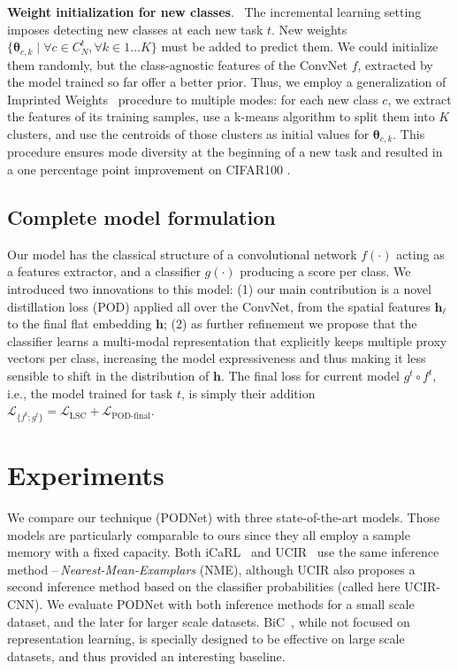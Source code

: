 \documentclass[runningheads]{llncs}
\let\thetaold\theta
\renewcommand{\theta}{\boldsymbol{\thetaold}}
\newcommand{\vh}{\mathbf{h}}
\newcommand{\parag}[1]{\vspace{0.2cm}\noindent\textbf{#1}.\ }
\begin{document}
\parag{Weight initialization for new classes} The incremental learning setting imposes detecting new classes at each new task $t$. New weights $\{\theta_{c,k} \mid \forall c \in C^t_N, \forall k \in {1...K}\}$ must be added to predict them. We could initialize them randomly, but the class-agnostic features of the ConvNet $f$, extracted by the model trained so far offer a better prior. Thus, we employ a generalization of Imprinted Weights~\cite{qi2018imprintedweights} procedure to multiple modes: for each new class $c$, we extract the features of its training samples, use a k-means algorithm to split them into $K$ clusters, and use the centroids of those clusters as initial values for $\theta_{c,k}$. This procedure ensures mode diversity at the beginning of a new task and resulted in a one percentage point improvement on CIFAR100 \cite{krizhevskycifar100}.



\subsection{Complete model formulation}

Our model has the classical structure of a convolutional network $f(\cdot)$ acting as a features extractor, and a classifier $g(\cdot)$ producing a score per class. We introduced two innovations to this model: (1) our main contribution is a novel distillation loss (POD) applied all over the ConvNet, from the spatial features $\vh_\ell$ to the final flat embedding $\vh$; (2) as further refinement we propose that the classifier learns a multi-modal representation that explicitly keeps multiple proxy vectors per class, increasing the model expressiveness and thus making it less sensible to shift in the distribution of $\vh$. The final loss for current model $g^t \circ f^t$, i.e., the model trained for task $t$, is simply their addition $\mathcal{L}_{\{f^t; g^t\}} = \mathcal{L}_\textrm{LSC} + \mathcal{L}_\textrm{POD-final}$.


\section{Experiments}
\label{sec:expes}






We compare our technique (PODNet) with three state-of-the-art models. Those models are particularly comparable to ours since they all employ a sample memory with a fixed capacity. Both iCaRL~\cite{rebuffi2017icarl} and UCIR~\cite{hou2019ucir} use the same inference method --\,\textit{Nearest-Mean-Examplars} (NME), although UCIR also proposes a second inference method based on the classifier probabilities (called here UCIR-CNN). We evaluate PODNet with both inference methods for a small scale dataset, and the later for larger scale datasets. BiC~\cite{wu2019bias_correction}, while not focused on representation learning, is specially designed to be effective on large scale datasets, and thus provided an interesting baseline.
\end{document}
